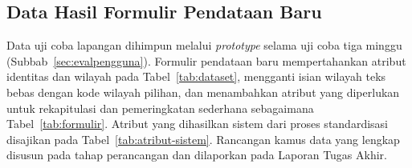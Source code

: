 \subsection{Data Hasil Formulir Pendataan Baru}
\label{sec:data-formulir}

Data uji coba lapangan dihimpun melalui \textit{prototype} selama uji coba tiga minggu (Subbab~\ref{sec:evalpengguna}). Formulir pendataan baru mempertahankan atribut identitas dan wilayah pada Tabel~\ref{tab:dataset}, mengganti isian wilayah teks bebas dengan kode wilayah pilihan, dan menambahkan atribut yang diperlukan untuk rekapitulasi dan pemeringkatan sederhana sebagaimana Tabel~\ref{tab:formulir}. Atribut yang dihasilkan sistem dari proses standardisasi disajikan pada Tabel~\ref{tab:atribut-sistem}. Rancangan kamus data yang lengkap disusun pada tahap perancangan dan dilaporkan pada Laporan Tugas Akhir.

